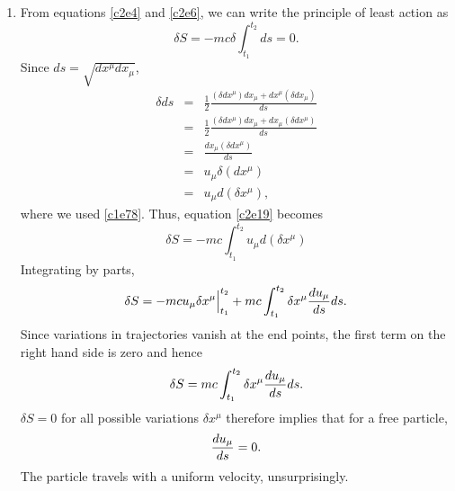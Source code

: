 \begin{enumerate}
\item From equations \eqref{c2e4} and \eqref{c2e6}, we can write the principle of
least action as
\begin{equation}\label{c2e19}
\delta S = -mc\delta\int_{t_1}^{t_2} ds = 0.
\end{equation}
Since $ds = \sqrt{dx^\mu dx_\mu}$, 
\begin{eqnarray*}
\delta ds &=& \frac{1}{2}\frac{(\delta dx^\mu)dx_\mu + dx^\mu (\delta dx_\mu)}{ds} \\
 &=& \frac{1}{2}\frac{(\delta dx^\mu)dx_\mu + dx_\mu (\delta dx^\mu)}{ds} \\
 &=& \frac{dx_\mu(\delta dx^\mu)}{ds} \\
 &=& u_\mu \delta(dx^\mu) \\
 &=& u_\mu d(\delta x^\mu),
\end{eqnarray*}
where we used \eqref{c1e78}. Thus, equation \eqref{c2e19} becomes
\begin{equation}\label{c2e20}
\delta S = -mc\int_{t_1}^{t_2}u_\mu d(\delta x^\mu)
\end{equation}
Integrating by parts,
\begin{equation}\label{c2e21}
\delta S = -mc u_\mu \delta x^\mu\Big|_{t_1}^{t_2} + 
mc\int_{t_1}^{t_2}\delta x^\mu \frac{d{u_\mu}}{d{s}}ds.
\end{equation}
Since variations in trajectories vanish at the end points, the first term on the
right hand side is zero and hence
\begin{equation}\label{c2e22}
\delta S = mc\int_{t_1}^{t_2}\delta x^\mu \frac{d{u_\mu}}{d{s}}ds.
\end{equation}
$\delta S = 0$ for all possible variations $\delta x^\mu$ therefore implies that 
for a free particle,
\begin{equation}\label{c2e23}
\frac{d{u_\mu}}{d{s}} = 0.
\end{equation}
The particle travels with a uniform velocity, unsurprisingly.


\end{enumerate}
